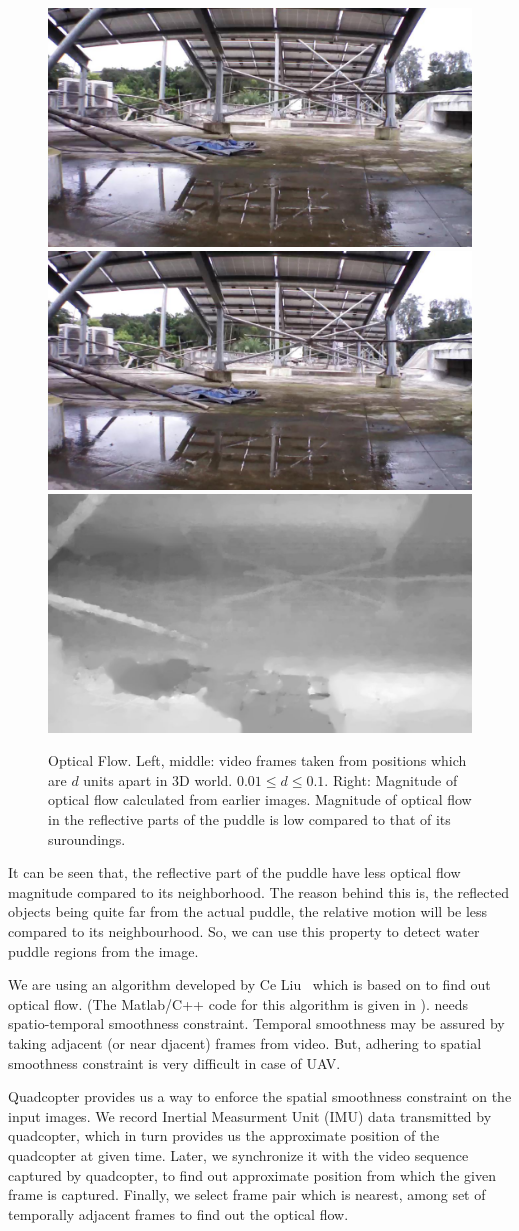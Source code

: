 \documentclass[times,10pt,twocolumn,letterpaper]{article}
\begin{document}
\begin{figure}[h!]
\centering
\includegraphics[width=0.3\linewidth]{images/IMG_PAIR_27_1.jpg}
\includegraphics[width=0.3\linewidth]{images/IMG_PAIR_27_2.jpg}
\includegraphics[width=0.3\linewidth]{images/IMG_PAIR_27_optical_flow.jpg}
\caption{Optical Flow. Left, middle: video frames taken from positions
which are $d$ units apart in 3D world. $ 0.01 \leq d \leq 0.1$. Right:
Magnitude of optical flow calculated from earlier images. Magnitude of optical
flow in the reflective parts of the puddle is low compared to that of its
suroundings.}
\label{fig:optical_flow}
\end{figure}

It can be seen that, the reflective part of the puddle have less optical flow
magnitude compared to its neighborhood. The reason behind this is, the
reflected objects being quite far from the actual puddle, the relative motion
will be less compared to its neighbourhood. So, we can use this property to
detect water puddle regions from the image.

We are using an algorithm  developed by Ce Liu~\cite{Liu11Thesis} which is based
on \cite{Brox04,Bruhn05} to find out optical flow. (The Matlab/C++ code for this
algorithm is given in \cite{Liu11}). \cite{Brox04} needs spatio-temporal
smoothness constraint. Temporal smoothness may be assured by taking adjacent (or
near djacent) frames from video. But, adhering to spatial smoothness constraint
is very difficult in case of UAV. 

Quadcopter provides us a way to enforce the spatial smoothness constraint on
the input images. We record Inertial Measurment Unit (IMU) data
transmitted by quadcopter, which in turn provides us the approximate position of
the quadcopter at given time. Later, we synchronize it with the video sequence
captured by quadcopter, to find out approximate position from which the given
frame is captured. Finally, we select frame pair which is nearest, among set of
temporally adjacent frames to find out the optical flow.
\end{document}
